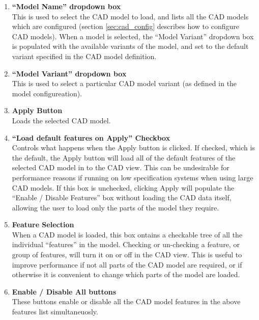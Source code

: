\documentclass[12pt]{article}
\begin{document}
\begin{enumerate}
\item{\textbf{``Model Name'' dropdown box}\\This is used to select the CAD model to load, and lists all the CAD models which are configured (section \ref{sec:cad_config} describes how to configure CAD models). When a model is selected, the ``Model Variant'' dropdown box is populated with the available variants of the model, and set to the default variant specified in the CAD model definition.}
\item{\textbf{``Model Variant'' dropdown box}\\This is used to select a particular CAD model variant (as defined in the model configureation).}
\item{\textbf{Apply Button}\\ Loads the selected CAD model.} 
\item{\textbf{``Load default features on Apply'' Checkbox}\\ Controls what happens when the Apply button is clicked. If checked, which is the default, the Apply button will load all of the default features of the selected CAD model in to the CAD view. This can be undesirable for performance reasons if running on low specification systems when using large CAD models. If this box is unchecked, clicking Apply will populate the ``Enable / Disable Features'' box without loading the CAD data itself, allowing the user to load only the parts of the model they require.} 
\item{\textbf{Feature Selection}\\When a CAD model is loaded, this box ontains a checkable tree of all the individual ``features'' in the model. Checking or un-checking a feature, or group of features, will turn it on or off in the CAD view. This is useful to improve performance if not all parts of the CAD model are required, or if otherwise it is convenient to change which parts of the model are loaded.}
\item{\textbf{Enable / Disable All buttons}\\ These buttons enable or disable all the CAD model features in the above features list simultaneuosly.}
\end{enumerate}
\end{document}

